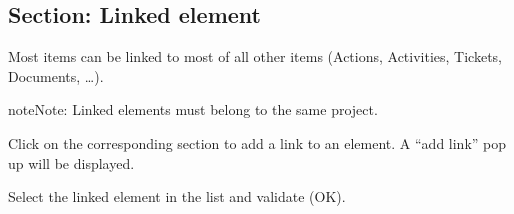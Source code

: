 \documentclass[letterpaper,10pt,english]{sphinxmanual}
\begin{document}
\subsection{Section: Linked element}
\label{Gui:section-linked-element}\label{Gui:gui-linkelement-section-label}
Most items can be linked to most of all other items (Actions, Activities, Tickets, Documents, …).

\begin{notice}{note}{Note:}
Linked elements must belong to the same project.
\end{notice}

Click  on the corresponding section to add a link to an element. A “add link” pop up will be displayed.

Select the linked element in the list and validate (OK).
\end{document}
